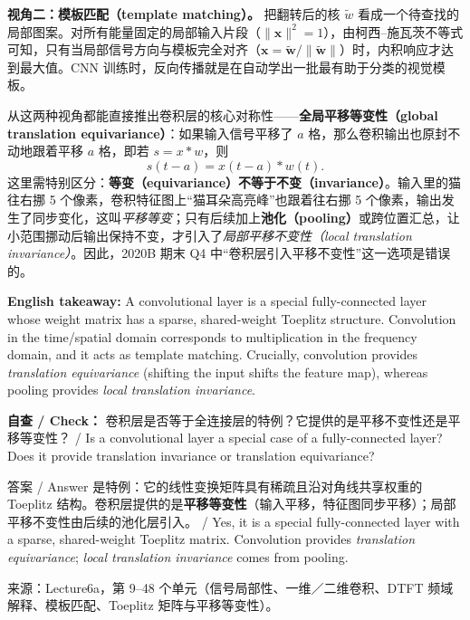 \textbf{视角二：模板匹配（template matching）。} 把翻转后的核 $\tilde{w}$ 看成一个待查找的局部图案。对所有能量固定的局部输入片段（$\|\mathbf{x}\|^2=1$），由柯西–施瓦茨不等式可知，只有当局部信号方向与模板完全对齐（$\mathbf{x}=\tilde{\mathbf{w}}/\|\tilde{\mathbf{w}}\|$）时，内积响应才达到最大值。CNN 训练时，反向传播就是在自动学出一批最有助于分类的视觉模板。

从这两种视角都能直接推出卷积层的核心对称性——\textbf{全局平移等变性（global translation equivariance）}：如果输入信号平移了 $a$ 格，那么卷积输出也原封不动地跟着平移 $a$ 格，即若 $s = x * w$，则
\[
s(t-a) = x(t-a) * w(t).
\tag{6.5}
\]
这里需特别区分：\textbf{等变（equivariance）不等于不变（invariance）}。输入里的猫往右挪 5 个像素，卷积特征图上“猫耳朵高亮峰”也跟着往右挪 5 个像素，输出发生了同步变化，这叫\emph{平移等变}；只有后续加上\textbf{池化（pooling）}或跨位置汇总，让小范围挪动后输出保持不变，才引入了\emph{局部平移不变性（local translation invariance）}。因此，2020B 期末 Q4 中“卷积层引入平移不变性”这一选项是错误的。

\textbf{English takeaway:} A convolutional layer is a special fully-connected layer whose weight matrix has a sparse, shared-weight Toeplitz structure. Convolution in the time/spatial domain corresponds to multiplication in the frequency domain, and it acts as template matching. Crucially, convolution provides \emph{translation equivariance} (shifting the input shifts the feature map), whereas pooling provides \emph{local translation invariance}.

\textbf{自查 / Check：} 卷积层是否等于全连接层的特例？它提供的是平移不变性还是平移等变性？ / Is a convolutional layer a special case of a fully-connected layer? Does it provide translation invariance or translation equivariance?

\begin{StudySolution}{答案 / Answer}
是特例：它的线性变换矩阵具有稀疏且沿对角线共享权重的 Toeplitz 结构。卷积层提供的是\textbf{平移等变性}（输入平移，特征图同步平移）；局部平移不变性由后续的池化层引入。 / Yes, it is a special fully-connected layer with a sparse, shared-weight Toeplitz matrix. Convolution provides \emph{translation equivariance}; \emph{local translation invariance} comes from pooling.
\end{StudySolution}

来源：Lecture6a，第 9–48 个单元（信号局部性、一维／二维卷积、DTFT 频域解释、模板匹配、Toeplitz 矩阵与平移等变性）。



